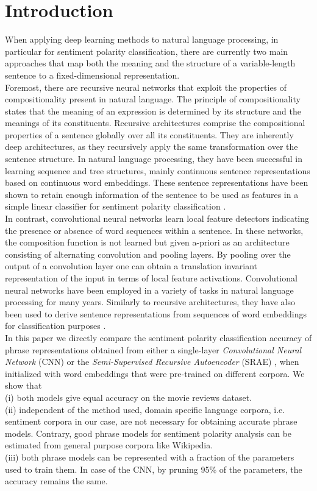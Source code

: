 \documentclass{llncs}
\begin{document}
\section{Introduction}
When applying deep learning methods to natural language processing, in particular for sentiment polarity classification, there are currently two main approaches that map both the meaning and the structure of a variable-length sentence to a fixed-dimensional representation. \\
Foremost, there are recursive neural networks that exploit the properties of compositionality present in natural language. The principle of compositionality states that the meaning of an expression is determined by its structure and the meanings of its constituents. Recursive architectures comprise the compositional properties of a sentence globally over all its constituents. They are inherently deep architectures, as they recursively apply the same transformation over the sentence structure. In natural language processing, they have been successful in learning sequence and tree structures, mainly continuous sentence representations based on continuous word embeddings. These sentence representations have been shown to retain enough information of the sentence to be used as features in a simple linear classifier for sentiment polarity classification \cite{socher2010learning}\cite{socher:2011}\cite{socher:2013b}.\\
In contrast, convolutional neural networks learn local feature detectors indicating the presence or absence of word sequences within a sentence. In these networks, the composition function is not learned but given a-priori as an architecture consisting of alternating convolution and pooling layers. By pooling over the output of a convolution layer one can obtain a translation invariant representation of the input in terms of local feature activations. Convolutional neural networks have been employed in a variety of tasks in natural language processing for many years. Similarly to recursive architectures, they have also been used to derive sentence representations from sequences of word embeddings for classification purposes \cite{collobertweston}\cite{santos}.\\
In this paper we directly compare the sentiment polarity classification accuracy of phrase representations obtained from either a single-layer \emph{Convolutional Neural Network} (CNN) or the \emph{Semi-Supervised Recursive Autoencoder} (SRAE) \cite{socher:2011}, when initialized with word embeddings that were pre-trained on different corpora. We show that\\
(i) both models give equal accuracy on the movie reviews dataset.\\
(ii) independent of the method used, domain specific language corpora, i.e. sentiment corpora in our case, are not necessary for obtaining accurate phrase models. Contrary, good phrase models for sentiment polarity analysis can be estimated from general purpose corpora like Wikipedia.\\
(iii) both phrase models can be represented with a fraction of the parameters used to train them. In case of the CNN, by pruning 95\% of the parameters, the accuracy remains the same.\\
\end{document}
